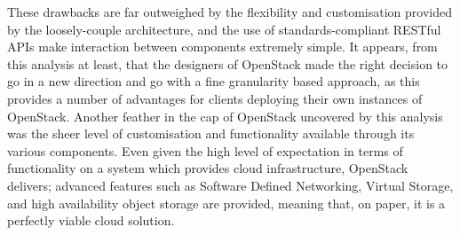 These drawbacks are far outweighed by the flexibility and customisation provided by the loosely-couple architecture, and the use of standards-compliant RESTful APIs make interaction between components extremely simple. It appears, from this analysis at least, that the designers of OpenStack made the right decision to go in a new direction and go with a fine granularity based approach, as this provides a number of advantages for clients deploying their own instances of OpenStack. 
Another feather in the cap of OpenStack uncovered by this analysis was the sheer level of customisation and functionality available through its various components. Even given the high level of expectation in terms of functionality on a system which provides cloud infrastructure, OpenStack delivers; advanced features such as Software Defined Networking, Virtual Storage, and high availability object storage are provided, meaning that, on paper, it is a perfectly viable cloud solution. 

 


